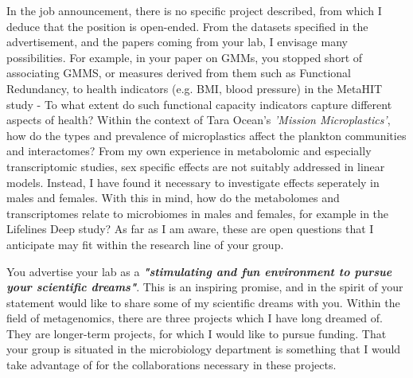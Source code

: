 \documentclass[letterpaper, 10pt]{article} %
\begin{document}
\begin{tcolorbox}[
	blanker,
	width=0.95\textwidth,
	enlarge left by=0.025\textwidth,
	enlarge right by=0.025\textwidth,
	before skip=6pt,
	breakable]
In the job announcement, there is no specific project described, from which I deduce that the position is open-ended. From the datasets specified in the advertisement, and the papers coming from your lab, I envisage many possibilities. For example, in your paper on GMMs, you stopped short of associating GMMS, or measures derived from them such as Functional Redundancy, to health indicators (e.g. BMI, blood pressure) in the MetaHIT study - To what extent do such functional capacity indicators capture different aspects of health? Within the context of Tara Ocean's \textit{'Mission Microplastics'}, how do the types and prevalence of microplastics affect the plankton communities and interactomes? From my own experience in metabolomic and especially transcriptomic studies, sex specific effects are not suitably addressed in linear models. Instead, I have found it necessary to investigate effects seperately in males and females. With this in mind, how do the metabolomes and transcriptomes relate to microbiomes in males and females, for example in the Lifelines Deep study? As far as I am aware, these are open questions that I anticipate may fit within the research line of your group.

You advertise your lab as a \textbf{\textit{"stimulating and fun environment to pursue your scientific dreams"}}. This is an inspiring promise, and in the spirit of your statement would like to share some of my scientific dreams with you. Within the field of metagenomics, there are three projects which I have long dreamed of. They are longer-term projects, for which I would like to pursue funding. That your group is situated in the microbiology department is something that I would take advantage of for the collaborations necessary in these projects.


\end{tcolorbox}
\end{document}
